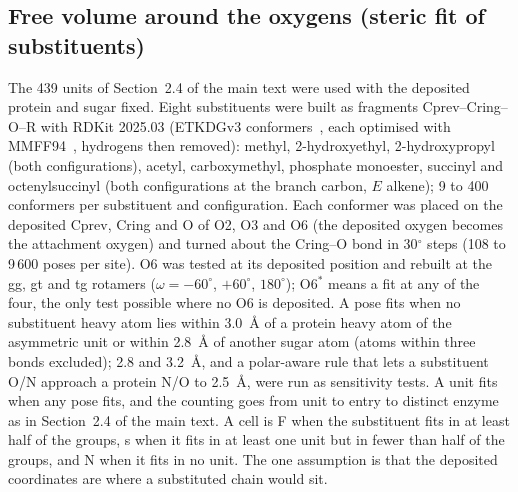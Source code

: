 \documentclass[preprint,12pt]{elsarticle}
\begin{document}
\subsection{Free volume around the oxygens (steric fit of substituents)}\label{sec:sifit}
The 439 units of Section~2.4 of the main text were used with the deposited protein and sugar fixed.
Eight substituents were built as fragments Cprev--\allowbreak Cring--\allowbreak O--\allowbreak R with RDKit 2025.03 (ETKDGv3
conformers~\citep{Wang2020}, each optimised with MMFF94~\citep{Halgren1996}, hydrogens then removed): methyl, 2-\hspace{0pt}hydroxyethyl,
2-\hspace{0pt}hydroxypropyl (both configurations), acetyl, carboxymethyl, phosphate monoester,
succinyl and octenylsuccinyl (both configurations at the branch carbon, $E$ alkene); 9 to 400 conformers
per substituent and configuration. Each conformer was placed on the deposited Cprev, Cring and O of O2, O3 and O6 (the
deposited oxygen becomes the attachment oxygen) and turned about the Cring--O bond in 30$^\circ$ steps
(108 to 9\,600 poses per site). O6 was tested at its deposited position and rebuilt at the gg, gt and
tg rotamers ($\omega = -60^\circ$, $+60^\circ$, $180^\circ$); O6$^\ast$ means a fit at any of the four,
the only test possible where no O6 is deposited. A pose fits when no substituent heavy atom lies within
3.0~\AA{} of a protein heavy atom of the asymmetric unit or within 2.8~\AA{} of another sugar atom (atoms
within three bonds excluded); 2.8 and 3.2~\AA{}, and a polar-aware rule that lets a substituent O/N
approach a protein N/O to 2.5~\AA, were run as sensitivity tests. A unit fits when any pose fits, and
the counting goes from unit to entry to distinct enzyme as in Section~2.4 of the main text. A cell
is F when the substituent fits in at least half of the groups, s when it fits in at least one unit
but in fewer than half of the groups, and N when it fits in no unit. The one assumption is that the
deposited coordinates are where a substituted chain would sit.
\end{document}
